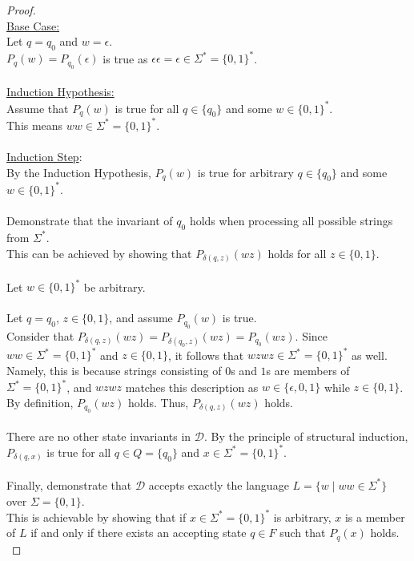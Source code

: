 \documentclass[12pt]{article}
\begin{document}
\begin{proof}
    \\
    \underline{Base Case:} \\
    Let $q = q_0$ and $w = \epsilon$. \\
    $P_q(w) = P_{q_0}(\epsilon)$ is true as $\epsilon \epsilon = \epsilon \in \Sigma^* = \{0, 1\}^*$. \\
    \\
    \underline{Induction Hypothesis:} \\
    Assume that $P_q(w)$ is true for all $q \in \{q_0\}$ and some $w \in \{0, 1\}^*$. \\
    This means $ww \in \Sigma^* = \{0, 1\}^*$. \\
    \\
    \underline{Induction Step}: \\
    By the Induction Hypothesis, $P_q(w)$ is true for arbitrary $q \in \{q_0\}$ and some $w \in \{0, 1\}^*$. \\
    \\
    Demonstrate that the invariant of $q_0$ holds when processing all possible strings from $\Sigma^*$. \\
    This can be achieved by showing that $P_{\delta(q, z)}(wz)$ holds for all $z \in \{0, 1\}$. \\
    \\
    Let $w \in \{0, 1\}^*$ be arbitrary. \\
    \\
    Let $q = q_0$, $z \in \{0, 1\}$, and assume $P_{q_0}(w)$ is true. \\
    Consider that $P_{\delta(q, z)}(wz) = P_{\delta(q_0, z)}(wz) = P_{q_0}(wz)$. Since $ww \in \Sigma^* = \{0, 1\}^*$ and $z \in \{0, 1\}$, it follows that $wzwz \in \Sigma^* = \{0, 1\}^*$ as well. Namely, this is because strings consisting of $0$s and $1$s are members of $\Sigma^* = \{0, 1\}^*$, and $wzwz$ matches this description as $w \in \{\epsilon, 0, 1\}$ while $z \in \{0, 1\}$. By definition, $P_{q_0}(wz)$ holds. Thus, $P_{\delta(q, z)}(wz)$ holds. \\
    \\
    There are no other state invariants in $\mathcal{D}$. By the principle of structural induction, $P_{\delta(q, x)}$ is true for all $q \in Q = \{q_0\}$ and $x \in \Sigma^* = \{0, 1\}^*$. \\
    \\
    Finally, demonstrate that $\mathcal{D}$ accepts exactly the language $L = \{ w \mid ww \in \Sigma^* \}$ over $\Sigma = \{0, 1\}$. \\
    This is achievable by showing that if $x \in \Sigma^* = \{0, 1\}^*$ is arbitrary, $x$ is a member of $L$ if and only if there exists an accepting state $q \in F$ such that $P_q(x)$ holds. \\

\end{proof}
\end{document}
